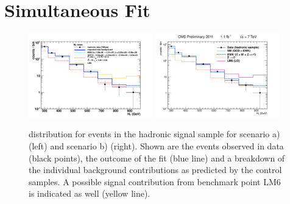 \section{Simultaneous Fit}


 \begin{figure}[h]
   \begin{center}
     \includegraphics[width = 0.48\textwidth]{Figures/Analysis/PAS/stats_plots/RQcdZero/hadronic_signal_fit_logy.pdf}
     \includegraphics[width = 0.48\textwidth]{Figures/Analysis/PAS/stats_plots/RQcdFallingExp/hadronic_signal_fit_logy.pdf}
     \caption{\label{fig:hadronic} \scalht distribution for events in the hadronic signal sample for scenario a) (left) and scenario b) (right). Shown are the events observed in data (black points), the outcome of the fit (blue line) and a breakdown of the individual background contributions as predicted by the control samples. A possible signal contribution from benchmark point LM6 is indicated as well (yellow line).}
   \end{center}
 \end{figure}

